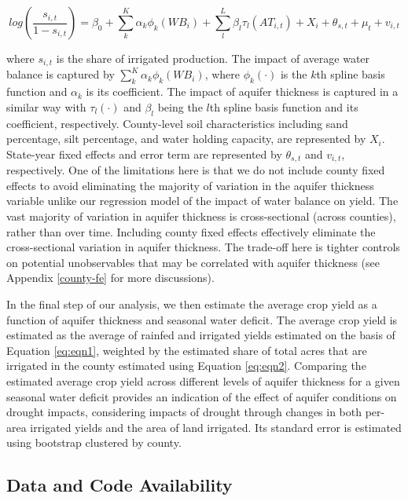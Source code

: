 \documentclass[
]{article}
\begin{document}
\begin{equation}
    log(\frac{s_{i,t}}{1-s_{i,t}}) = \beta_0 + \sum_{k}^K \alpha_{k}\phi_{k}(WB_{i}) + \sum_{l}^L \beta_{l}\tau_{l}(AT_{i,t}) + X_i + \theta_{s,t} + \mu_t + v_{i,t} \label{eq:eqn2}
\end{equation}

where \(s_{i,t}\) is the share of irrigated production. The impact of average water balance is captured by \(\sum_{k}^K \alpha_{k}\phi_{k}(WB_{i})\), where \(\phi_{k}(\cdot)\) is the \(k\)th spline basis function and \(\alpha_{k}\) is its coefficient. The impact of aquifer thickness is captured in a similar way with \(\tau_{l}(\cdot)\) and \(\beta_{l}\) being the \(l\)th spline basis function and its coefficient, respectively. County-level soil characteristics including sand percentage, silt percentage, and water holding capacity, are represented by \(X_i\). State-year fixed effects and error term are represented by \(\theta_{s,t}\) and \(v_{i,t}\), respectively. One of the limitations here is that we do not include county fixed effects to avoid eliminating the majority of variation in the aquifer thickness variable unlike our regression model of the impact of water balance on yield. The vast majority of variation in aquifer thickness is cross-sectional (across counties), rather than over time. Including county fixed effects effectively eliminate the cross-sectional variation in aquifer thickness. The trade-off here is tighter controls on potential unobservables that may be correlated with aquifer thickness (see Appendix \ref{county-fe} for more discussions).

In the final step of our analysis, we then estimate the average crop yield as a function of aquifer thickness and seasonal water deficit. The average crop yield is estimated as the average of rainfed and irrigated yields estimated on the basis of Equation \eqref{eq:eqn1}, weighted by the estimated share of total acres that are irrigated in the county estimated using Equation \eqref{eq:eqn2}. Comparing the estimated average crop yield across different levels of aquifer thickness for a given seasonal water deficit provides an indication of the effect of aquifer conditions on drought impacts, considering impacts of drought through changes in both per-area irrigated yields and the area of land irrigated. Its standard error is estimated using bootstrap clustered by county.

\hypertarget{data-and-code-availability}{%
\subsection{Data and Code Availability}\label{data-and-code-availability}}
\end{document}
